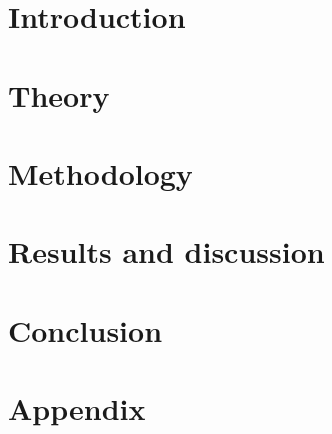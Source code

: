 \documentclass[english, a4paper, 12pt, twoside]{report}
\begin{document}
\newpage

\tableofcontents
\linespread{1}
\listoffigures
\linespread{1.25}
\newpage
{}

\chapter{Introduction}


\chapter{Theory}


\chapter{Methodology} \label{sec:methodology}


\chapter{Results and discussion}


\chapter{Conclusion}


\clearpage



\appendix
\chapter{Appendix}

\end{document}
